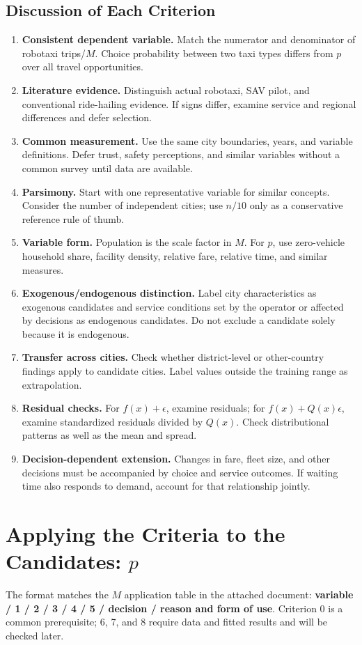 \documentclass[10pt,a4paper]{article}
\begin{document}
\subsection{Discussion of Each Criterion}
\begin{enumerate}[start=0]
\item \textbf{Consistent dependent variable.} Match the numerator and denominator of robotaxi trips/$M$. Choice probability between two taxi types differs from $p$ over all travel opportunities.
\item \textbf{Literature evidence.} Distinguish actual robotaxi, SAV pilot, and conventional ride-hailing evidence. If signs differ, examine service and regional differences and defer selection.
\item \textbf{Common measurement.} Use the same city boundaries, years, and variable definitions. Defer trust, safety perceptions, and similar variables without a common survey until data are available.
\item \textbf{Parsimony.} Start with one representative variable for similar concepts. Consider the number of independent cities; use $n/10$ only as a conservative reference rule of thumb.
\item \textbf{Variable form.} Population is the scale factor in $M$. For $p$, use zero-vehicle household share, facility density, relative fare, relative time, and similar measures.
\item \textbf{Exogenous/endogenous distinction.} Label city characteristics as exogenous candidates and service conditions set by the operator or affected by decisions as endogenous candidates. Do not exclude a candidate solely because it is endogenous.
\item \textbf{Transfer across cities.} Check whether district-level or other-country findings apply to candidate cities. Label values outside the training range as extrapolation.
\item \textbf{Residual checks.} For $f(x)+\epsilon$, examine residuals; for $f(x)+Q(x)\epsilon$, examine standardized residuals divided by $Q(x)$. Check distributional patterns as well as the mean and spread.
\item \textbf{Decision-dependent extension.} Changes in fare, fleet size, and other decisions must be accompanied by choice and service outcomes. If waiting time also responds to demand, account for that relationship jointly.
\end{enumerate}

\section{Applying the Criteria to the Candidates: $p$}
The format matches the $M$ application table in the attached document: \textbf{variable / 1 / 2 / 3 / 4 / 5 / decision / reason and form of use}. Criterion 0 is a common prerequisite; 6, 7, and 8 require data and fitted results and will be checked later.
\end{document}
